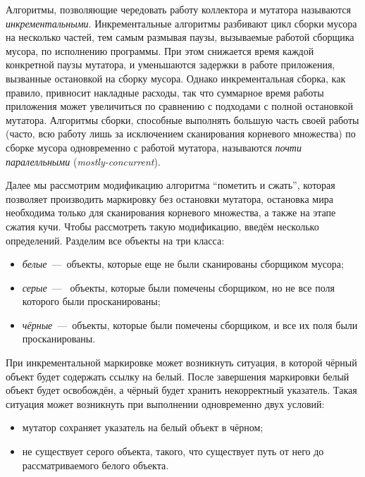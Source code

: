 Алгоритмы, позволяющие чередовать работу коллектора и мутатора называются 
\emph{инкрементальными}. 
Инкрементальные алгоритмы разбивают цикл сборки мусора на несколько частей, 
тем самым размывая паузы, вызываемые работой сборщика мусора, по исполнению программы.
При этом снижается время каждой конкретной паузы мутатора, 
и уменьшаются задержки в работе приложения, вызванные остановкой на сборку 
мусора. 
Однако инкрементальная сборка, как правило, привносит накладные расходы, 
так что суммарное время работы приложения может увеличиться по сравнению 
с подходами с полной остановкой мутатора. 
Алгоритмы сборки, способные выполнять большую часть своей работы 
(часто, всю работу лишь за исключением сканирования корневого множества) 
по сборке мусора одновременно с работой мутатора, называются 
\emph{почти паралелльными} (\emph{mostly-concurrent}).  

Далее мы рассмотрим модификацию алгоритма ``пометить и сжать'', 
которая позволяет 
производить маркировку без остановки мутатора, остановка мира необходима только для 
сканирования корневого множества, а также на этапе сжатия кучи. 
Чтобы рассмотреть такую модификацию, введём несколько определений. 
Разделим все объекты на три класса: 

\begin{itemize}
\item 
	\emph{белые}~---~объекты, которые еще не были сканированы сборщиком мусора;
\item 
	\emph{серые}~---~ объекты, которые были помечены сборщиком, но не все поля 
	которого были просканированы;
\item 
	\emph{чёрные}~---~объекты, которые были помечены сборщиком, и все их поля 
	были просканированы.
\end{itemize}

При инкрементальной маркировке может возникнуть ситуация, в которой чёрный объект 
будет содержать ссылку на белый. 
После завершения маркировки белый объект будет освобождён, а чёрный будет хранить 
некорректный указатель. 
Такая ситуация может возникнуть при выполнении одновременно двух условий:
\begin{itemize}
\item 
	мутатор сохраняет указатель на белый объект в чёрном;
\item 
	не существует серого объекта, такого, что существует путь от него до рассматриваемого 
	белого объекта.
\end{itemize}

